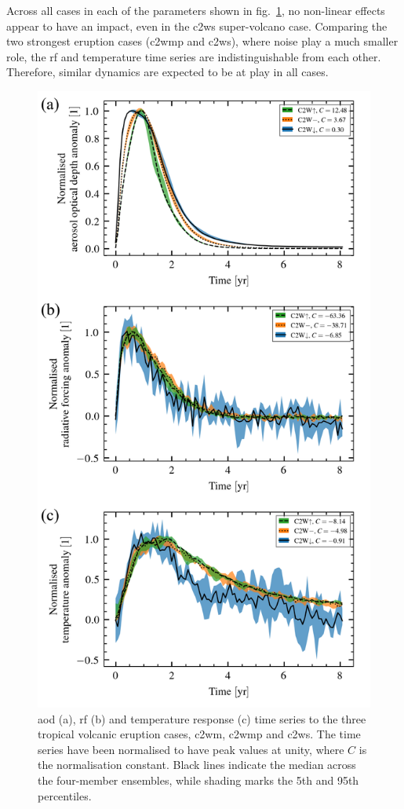 \documentclass{ametsocV6.1}
\begin{document}
Across all cases in each of the parameters shown in
fig.~\ref{fig:compare-waveform-temp}, no non-linear effects appear to have an impact,
even in the \gls{c2ws} super-volcano case. Comparing the two strongest eruption cases
(\gls{c2wmp} and \gls{c2ws}), where noise play a much smaller role, the \gls{rf} and
temperature time series are indistinguishable from each other. Therefore, similar
dynamics are expected to be at play in all cases.

\begin{figure}
  \centering
  \includegraphics{figures/figure1.png}

  \caption{\gls{aod} (a), \gls{rf} (b) and temperature response (c) time series to the
    three tropical volcanic eruption cases, \gls{c2wm}, \gls{c2wmp} and \gls{c2ws}. The time
    series have been normalised to have peak values at unity, where \(C\) is the
    normalisation constant. Black lines indicate the median across the four-member
    ensembles, while shading marks the 5th and 95th
    percentiles.}\label{fig:compare-waveform-temp}%
\end{figure}
\end{document}
